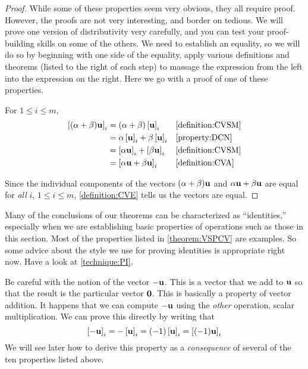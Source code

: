 \documentclass{ximera}
\begin{document}
\begin{theorem}
\begin{proof}
  While some of these properties seem very obvious, they all require
  proof.  However, the proofs are not very interesting, and border on
  tedious. We will prove one version of distributivity very carefully,
  and you can test your proof-building skills on some of the others.
  We need to establish an equality, so we will do so by beginning with
  one side of the equality, apply various definitions and theorems
  (listed to the right of each step) to massage the expression from
  the left into the expression on the right.  Here we go with a proof
  of one of these properties.

  For $1\leq i\leq m$,
  \begin{align*}
    \left\lbrack(\alpha+\beta)\mathbf{u}\right\rbrack_{i}
    &=(\alpha+\beta)\left\lbrack\mathbf{u}\right\rbrack_{i}
    &&\ref{definition:CVSM}\\
    &=\alpha\left\lbrack\mathbf{u}\right\rbrack_{i}+\beta\left\lbrack\mathbf{u}\right\rbrack_{i}
    &&\ref{property:DCN}\\
    &=\left\lbrack\alpha\mathbf{u}\right\rbrack_{i}+\left\lbrack\beta\mathbf{u}\right\rbrack_{i}
    &&\ref{definition:CVSM}\\
    &=\left\lbrack\alpha\mathbf{u}+\beta\mathbf{u}\right\rbrack_{i}
    &&\ref{definition:CVA}\\
  \end{align*}

  Since the individual components of the vectors
  $(\alpha+\beta)\mathbf{u}$ and $\alpha\mathbf{u}+\beta\mathbf{u}$ are
  equal for \textit{all} $i$, $1\leq i\leq m$, \ref{definition:CVE}
  tells us the vectors are equal.
\end{proof}
\end{theorem}

Many of the conclusions of our theorems can be characterized as
``identities,'' especially when we are establishing basic properties
of operations such as those in this section.  Most of the properties
listed in \ref{theorem:VSPCV} are examples.  So some advice about the
style we use for proving identities is appropriate right now.  Have a
look at \ref{technique:PI}.


Be careful with the notion of the vector $\mathbf{-u}$.  This is a
vector that we add to $\mathbf{u}$ so that the result is the particular
vector $\mathbf{0}$.  This is basically a property of vector
addition.  It happens that we can compute $\mathbf{-u}$ using the
\textit{other} operation, scalar multiplication.  We can prove this
directly by writing that
\[
  \left\lbrack\mathbf{-u}\right\rbrack_{i}
  =-\left\lbrack\mathbf{u}\right\rbrack_{i}
  =(-1)\left\lbrack\mathbf{u}\right\rbrack_{i}
  =\left\lbrack(-1)\mathbf{u}\right\rbrack_{i}
\]
We will see later how to derive this property as a
\textit{consequence} of several of the ten properties listed above.
\end{document}
